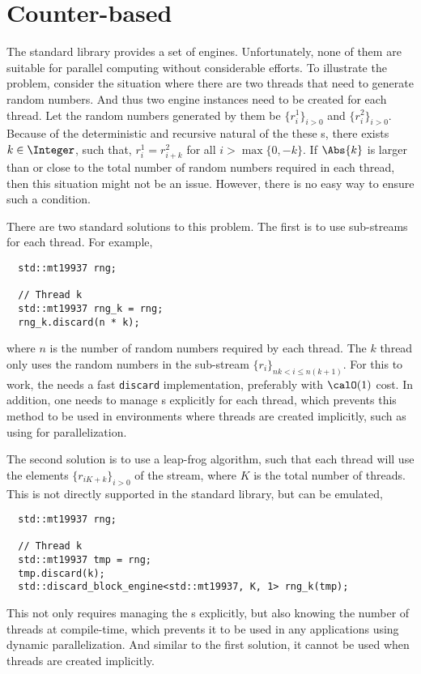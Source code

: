 \section{Counter-based \texorpdfstring{\protect\rng}{RNG}}
\label{sec:Counter-based RNG}

The standard library provides a set of \rng engines. Unfortunately, none of
them are suitable for parallel computing without considerable efforts. To
illustrate the problem, consider the situation where there are two threads that
need to generate random numbers. And thus two \rng engine instances need to be
created for each thread. Let the random numbers generated by them be
$\{r_i^1\}_{i>0}$ and $\{r_i^2\}_{i>0}$. Because of the deterministic and
recursive natural of the these \rng{}s, there exists $k\in\Integer$, such that,
$r_i^1 = r_{i + k}^2$ for all $i > \max\{0, -k\}$. If $\Abs{k}$ is larger than
or close to the total number of random numbers required in each thread, then
this situation might not be an issue. However, there is no easy way to ensure
such a condition.

There are two standard solutions to this problem. The first is to use
sub-streams for each thread. For example,
\begin{Verbatim}
  std::mt19937 rng;

  // Thread k
  std::mt19937 rng_k = rng;
  rng_k.discard(n * k);
\end{Verbatim}
where $n$ is the number of random numbers required by each thread. The $k$\ith
thread only uses the random numbers in the sub-stream $\{r_i\}_{nk < i \le
  n(k+1)}$. For this to work, the \rng needs a fast \verb|discard|
implementation, preferably with $\calO(1)$ cost. In addition, one needs to
manage \rng{}s explicitly for each thread, which prevents this method to be
used in environments where threads are created implicitly, such as using \tbb
for parallelization.

The second solution is to use a leap-frog algorithm, such that each thread will
use the elements $\{r_{iK + k}\}_{i>0}$ of the stream, where $K$ is the total
number of threads. This is not directly supported in the standard library, but
can be emulated,
\begin{Verbatim}
  std::mt19937 rng;

  // Thread k
  std::mt19937 tmp = rng;
  tmp.discard(k);
  std::discard_block_engine<std::mt19937, K, 1> rng_k(tmp);
\end{Verbatim}
This not only requires managing the \rng{}s explicitly, but also knowing the
number of threads at compile-time, which prevents it to be used in any
applications using dynamic parallelization. And similar to the first solution,
it cannot be used when threads are created implicitly.

